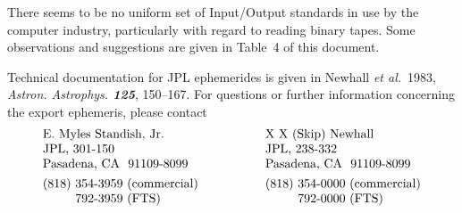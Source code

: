 There seems to be no uniform set of Input/Output standards in use by
the computer industry, particularly with regard to reading
binary tapes. Some observations and suggestions are given in Table~4 of
this document.
 
Technical documentation for JPL ephemerides is given in
Newhall {\it et al.}~1983, {\it Astron. Astrophys. \bf 125},
150--167.
For questions or further information concerning the export
ephemeris, please contact
$$\hbox{\vtop{\hbox{E.~Myles Standish, Jr.}%
\hbox{JPL, 301-150}\hbox{Pasadena, CA\ \ 91109-8099}%
\kern4pt
\hbox{(818) 354-3959 (commercial)}%
\hbox{\phantom{(818)} 792-3959 (FTS)}}\hbox to.7truein{}
\vtop{\hbox{X~X~(Skip)~Newhall}\hbox{JPL, 238-332}%
\hbox{Pasadena, CA\ \ 91109-8099}%
\kern4pt
\hbox{(818) 354-0000 (commercial)}%
\hbox{\phantom{(818)} 792-0000 (FTS)}}}$$

\newpage                                               %


